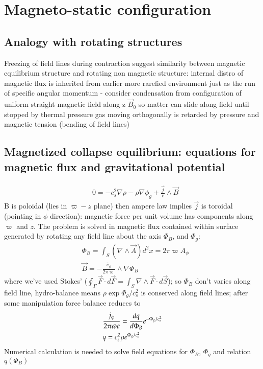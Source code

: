 \documentclass[main.tex]{subfiles}
\begin{document}
\section{Magneto-static configuration}
\subsection{Analogy with rotating structures}
Freezing of field lines during contraction suggest similarity between magnetic equilibrium structure and rotating non magnetic structure: internal distro of magnetic flux is inherited from earlier more rarefied environment just as the run of specific angular momentum - consider condensation from configuration of uniform straight magnetic field along z $\vec{B}_0$ so matter can slide along field until stopped by thermal pressure gas moving orthogonally is retarded by pressure and magnetic tension (bending of field lines)
\subsection{Magnetized collapse equilibrium: equations for magnetic flux and gravitational potential}
\begin{align*}
&0=-c_s^2\nabla\rho-\rho\nabla\phi_g+\frac{\vec{j}}{c}\wedge\vec{B}
\end{align*}
B is poloidal (lies in $\varpi-z$ plane) then ampere law implies $\vec{j}$ is toroidal (pointing in $\phi$ direction): magnetic force per unit volume has components along $\varpi$ and $z$. The problem is solved in magnetic flux contained within surface generated by rotating any field line about the axis $\Phi_B$, and $\Phi_g$:
\begin{align*}
&\Phi_B=\int_S(\nabla\wedge\vec{A})d^2x=2\pi\varpi A_{\phi}\\
&\vec{B}=-\frac{\hat{e}_{\phi}}{2\pi\varpi}\wedge\nabla\Phi_B
\end{align*}
where we've used Stokes' ($\oint_{\Gamma}\vec{F}\cdot d\vec{F}=\int_S\nabla\wedge\vec{F}\cdot d\vec{S}$); so $\Phi_B$ don't varies along field line, hydro-balance means $\rho\exp{\Phi_g/c_s^2}$ is conserved along field lines; after some manipulation force balance reduces to
\begin{align*}
&\frac{j_{\phi}}{2\pi\varpi c}=\TDy{\Phi_B}{q}\exp{-\Phi_g/c_s^2}\\
&q=c_s^2\rho\exp{\Phi_g/c_s^2}
\end{align*}
Numerical calculation is needed to solve field equations for $\Phi_B$, $\Phi_g$ and relation $q(\Phi_B)$
\end{document}
